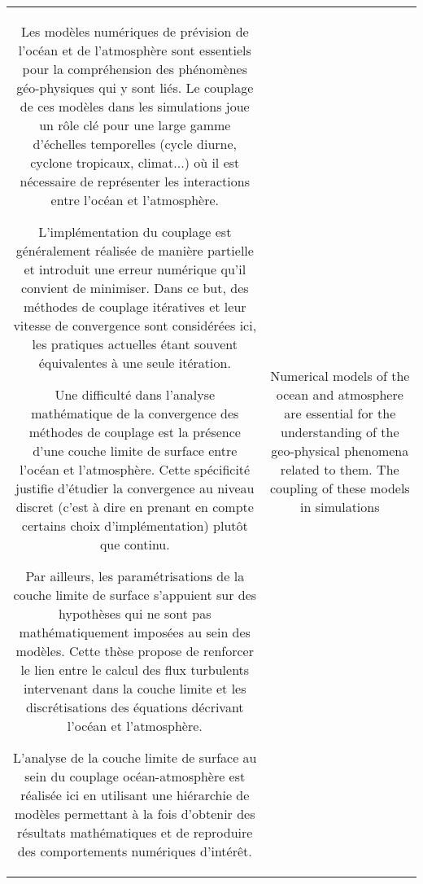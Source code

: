 \clearpage
{}
{}
\thispagestyle{empty}
\begin{tabular}{c|c}
{\begin{minipage}{18em}
Les modèles numériques de prévision de l'océan et de l'atmosphère
sont essentiels pour la compréhension des phénomènes géo-physiques
qui y sont liés.
Le couplage de ces modèles dans les simulations
joue un rôle clé pour une large gamme d'échelles temporelles
(cycle diurne, cyclone tropicaux, climat...)
où il est nécessaire de représenter les interactions entre l'océan et
l'atmosphère.
\par
	\vspace{0.2cm}
L'implémentation du couplage est généralement réalisée de manière
partielle et introduit une erreur numérique qu'il convient de
minimiser. Dans ce but, des méthodes de couplage itératives et
leur vitesse de convergence sont considérées ici, les pratiques
actuelles étant souvent équivalentes à une seule itération.
\par
	\vspace{0.2cm}
Une difficulté dans l'analyse mathématique de la convergence
des méthodes de couplage est la présence d'une couche limite
de surface entre l'océan et l'atmosphère.
Cette spécificité justifie d'étudier la convergence au niveau
discret (c'est à dire en prenant en compte certains choix
d'implémentation) plutôt que continu.
\par
	\vspace{0.2cm}
Par ailleurs, les paramétrisations de la couche limite
de surface s'appuient sur des hypothèses
qui ne sont pas mathématiquement imposées au sein des modèles.
Cette thèse propose de renforcer le lien entre
le calcul des flux turbulents intervenant dans la couche limite
et les discrétisations des équations décrivant l'océan
et l'atmosphère.
\par
	\vspace{0.2cm}
L'analyse de la couche limite de surface au sein du couplage
océan-atmosphère est réalisée ici en utilisant une hiérarchie
de modèles permettant à la fois d'obtenir des résultats
mathématiques et de reproduire des comportements numériques d'intérêt.
\end{minipage}}
&
{\begin{minipage}{18em}
Numerical models of the ocean and atmosphere
are essential for the understanding of the geo-physical phenomena related to them.
The coupling of these models in simulations

\end{minipage}}
\end{tabular}
